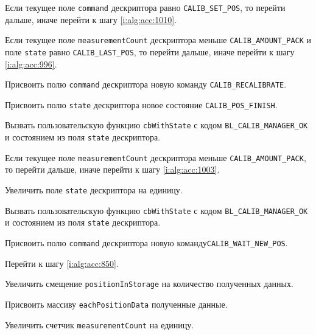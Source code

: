 \begin{enumerate_step}
    \item \label{i:alg:acc:985} Если текущее поле \lstinline|command| дескриптора равно \lstinline|CALIB_SET_POS|, то перейти дальше, иначе перейти к шагу
    \ref{i:alg:acc:1010}.
    \item \label{i:alg:acc:988} Если текущее поле \lstinline|measurementCount| дескриптора меньше \lstinline|CALIB_AMOUNT_PACK| и поле \lstinline|state| равно
    \lstinline|CALIB_LAST_POS|, то перейти дальше, иначе перейти к шагу \ref{i:alg:acc:996}.
    \item Присвоить полю \lstinline|command| дескриптора  новую команду \lstinline|CALIB_RECALIBRATE|.
    \item Присвоить полю \lstinline|state| дескриптора новое состояние \lstinline|CALIB_POS_FINISH|.
    \item Вызвать пользовательскую функцию \lstinline|cbWithState| с кодом \lstinline|BL_CALIB_MANAGER_OK| и состоянием из поля \lstinline|state| дескриптора.
    \item \label{i:alg:acc:996} Если текущее поле \lstinline|measurementCount| дескриптора меньше \lstinline|CALIB_AMOUNT_PACK|, то перейти дальше, иначе перейти к шагу \ref{i:alg:acc:1003}.
    \item Увеличить поле \lstinline|state| дескриптора на единицу.
    \item Вызвать пользовательскую функцию \lstinline|cbWithState| с кодом \lstinline|BL_CALIB_MANAGER_OK| и состоянием из поля \lstinline|state| дескриптора.
    \item Присвоить полю \lstinline|command| дескриптора новую команду\lstinline|CALIB_WAIT_NEW_POS|.
    \item Перейти к шагу \ref{i:alg:acc:850}.
    \item \label{i:alg:acc:1003} Увеличить смещение \lstinline|positionInStorage| на количество полученных данных.
    \item Присвоить массиву \lstinline|eachPositionData| полученные данные.
    \item Увеличить счетчик \lstinline|measurementCount| на единицу.


\end{enumerate_step}

